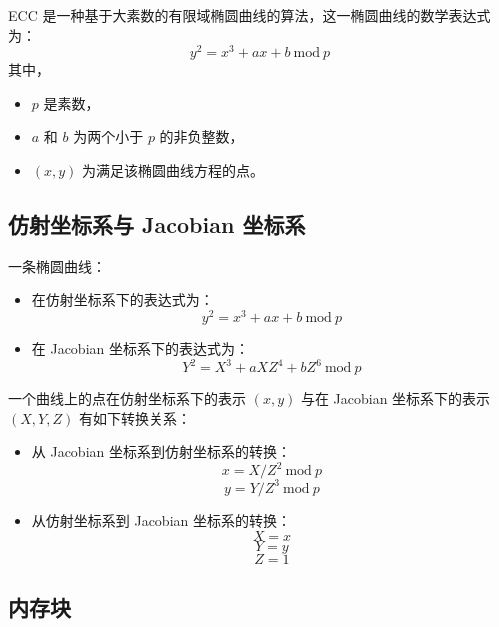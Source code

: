 \documentclass[main\_\_CN.tex]{subfiles}
\begin{document}
ECC 是一种基于大素数的有限域椭圆曲线的算法，这一椭圆曲线的数学表达式为：
\[
{y}^{2} = {x}^{3} + {ax} + b \ \textrm{mod}\ p
\]
其中，
\begin{itemize}
    \item $p$ 是素数，
    \item $a$ 和 $b$ 为两个小于 $p$ 的非负整数，
    \item $(x, y)$ 为满足该椭圆曲线方程的点。
\end{itemize}

\subsection{仿射坐标系与 Jacobian 坐标系}

一条椭圆曲线：
\begin{itemize}
    \item 在仿射坐标系下的表达式为：
    \[
    {y}^{2} = {x}^{3} + {ax} + b \ \textrm{mod}\ p
    \]
    \item 在 Jacobian 坐标系下的表达式为：
    \[
    {Y}^{2} = {X}^{3} + {aXZ}^{4} + {bZ}^{6} \ \textrm{mod}\ p
    \]
\end{itemize}

一个曲线上的点在仿射坐标系下的表示 $(x, y)$ 与在 Jacobian 坐标系下的表示 $(X, Y, Z)$ 有如下转换关系：

\begin{itemize}
    \item 从 Jacobian 坐标系到仿射坐标系的转换：
    \[
    x = X / {Z}^2 \ \textrm{mod}\ p
    \]
    \[
    y = Y / {Z}^3 \ \textrm{mod}\ p
    \]
    \item 从仿射坐标系到 Jacobian 坐标系的转换：
    \[ X = x \]
    \[ Y = y \]
    \[ Z = 1\]
\end{itemize}

\subsection{内存块}
\end{document}
